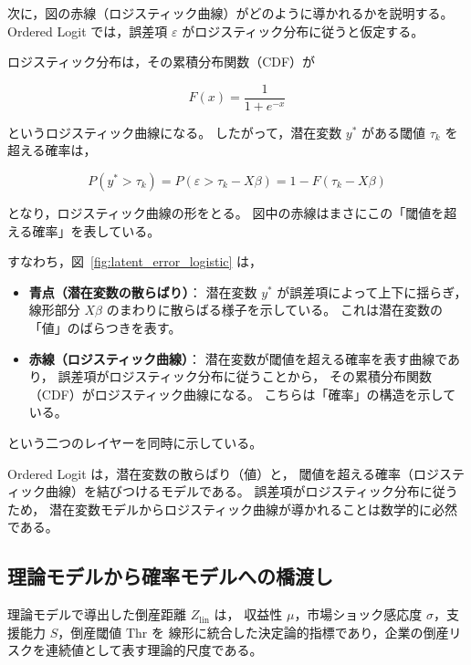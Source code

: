 次に，図の赤線（ロジスティック曲線）がどのように導かれるかを説明する。
Ordered Logit では，誤差項 $\varepsilon$ がロジスティック分布に従うと仮定する。

ロジスティック分布は，その累積分布関数（CDF）が



\[
F(x) = \frac{1}{1 + e^{-x}}
\]



というロジスティック曲線になる。
したがって，潜在変数 $y^*$ がある閾値 $\tau_k$ を超える確率は，



\[
P(y^* > \tau_k)
= P(\varepsilon > \tau_k - X\beta)
= 1 - F(\tau_k - X\beta)
\]



となり，ロジスティック曲線の形をとる。
図中の赤線はまさにこの「閾値を超える確率」を表している。

すなわち，図~\ref{fig:latent_error_logistic} は，

\begin{itemize}
    \item \textbf{青点（潜在変数の散らばり）}：  
    潜在変数 $y^*$ が誤差項によって上下に揺らぎ，
    線形部分 $X\beta$ のまわりに散らばる様子を示している。
    これは潜在変数の「値」のばらつきを表す。
    
    \item \textbf{赤線（ロジスティック曲線）}：  
    潜在変数が閾値を超える確率を表す曲線であり，
    誤差項がロジスティック分布に従うことから，
    その累積分布関数（CDF）がロジスティック曲線になる。
    こちらは「確率」の構造を示している。
\end{itemize}

という二つのレイヤーを同時に示している。

Ordered Logit は，潜在変数の散らばり（値）と，
閾値を超える確率（ロジスティック曲線）を結びつけるモデルである。
誤差項がロジスティック分布に従うため，
潜在変数モデルからロジスティック曲線が導かれることは数学的に必然である。



\subsection{理論モデルから確率モデルへの橋渡し}

理論モデルで導出した倒産距離 $Z_{\text{lin}}$ は，
収益性 $\mu$，市場ショック感応度 $\sigma$，支援能力 $S$，倒産閾値 $\mathrm{Thr}$ を
線形に統合した決定論的指標であり，企業の倒産リスクを連続値として表す理論的尺度である。

